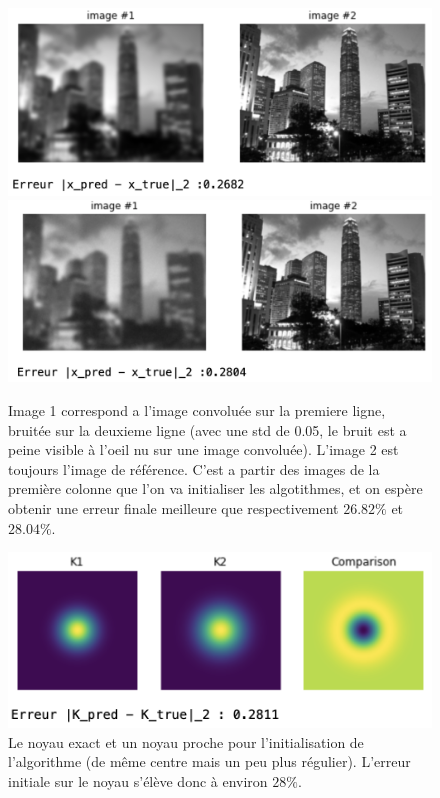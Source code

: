 \documentclass[a4paper]{article}
\begin{document}
\begin{figure}[h]
\includegraphics[scale=0.6]{figures/blurred}
\includegraphics[scale=0.6]{figures/noisy}
\caption{Image 1 correspond a l'image convoluée sur la premiere ligne, bruitée sur la deuxieme ligne (avec une std de 0.05, le bruit est a peine visible à l'oeil nu sur une image convoluée). L'image 2 est toujours l'image de référence. C'est a partir des images de la première colonne que l'on va initialiser les algotithmes, et on espère obtenir une erreur finale meilleure que respectivement $26.82\%$ et $28.04\%$.}
\end{figure}
%
\begin{figure}[h]
\includegraphics[scale=0.6]{figures/kernel}
\caption{Le noyau exact et un noyau proche pour l'initialisation de l'algorithme (de même centre mais un peu plus régulier).
L'erreur initiale sur le noyau s'élève donc à environ $28\%$.}
\end{figure}
\end{document}
